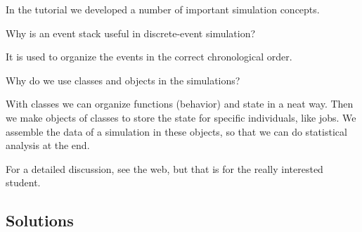 In the tutorial we developed a number of important simulation concepts.

\begin{exercise}[201904]
Why is  an event stack useful in discrete-event simulation? 
\begin{solution}
  It is used to organize the events in the correct chronological order. 
\end{solution}
\end{exercise}


\begin{exercise}[201904]
  Why do we use classes and objects in the simulations?
\begin{solution}
  With classes we can organize functions (behavior) and state in a neat way.
  Then we make objects of classes to store the state for specific individuals, like jobs.
  We assemble the data of a simulation in these objects, so that we can do statistical analysis at the end.

  For a detailed discussion, see the web, but that is for the really interested student.
\end{solution}
\end{exercise}


\subsection*{Solutions}




